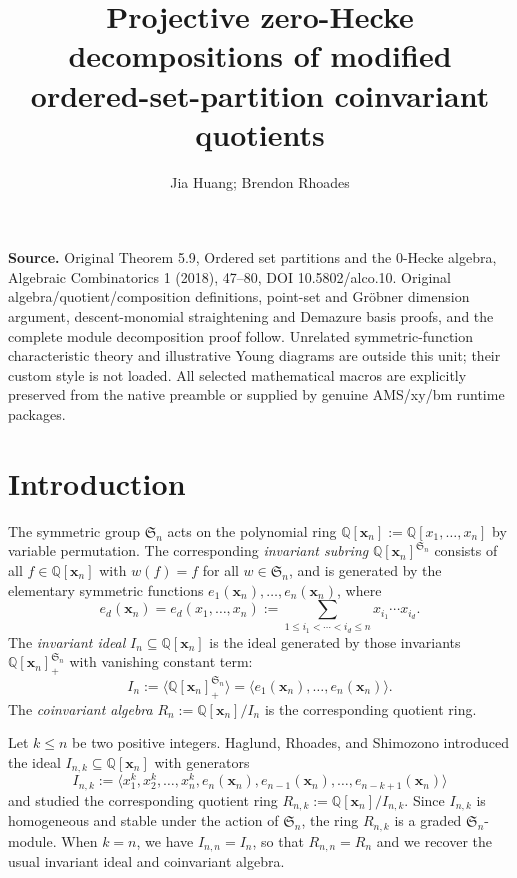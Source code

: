 \documentclass[10pt]{amsart}
\title[Projective zero-Hecke decompositions]{Projective zero-Hecke decompositions of modified ordered-set-partition coinvariant quotients}
\author{Jia Huang; Brendon Rhoades}
\date{}
\theoremstyle{definition}
\newcommand{\symm}{{\mathfrak{S}}}
\newcommand{\QQ}{{\mathbb {Q}}}
\newcommand{\xx}{{\mathbf {x}}}
\begin{document}
\maketitle
\noindent\textbf{Source.} Original Theorem 5.9, Ordered set partitions and the 0-Hecke algebra, Algebraic Combinatorics 1 (2018), 47--80, DOI 10.5802/alco.10. Original algebra/quotient/composition definitions, point-set and Gr\"obner dimension argument, descent-monomial straightening and Demazure basis proofs, and the complete module decomposition proof follow. Unrelated symmetric-function characteristic theory and illustrative Young diagrams are outside this unit; their custom style is not loaded. All selected mathematical macros are explicitly preserved from the native preamble or supplied by genuine AMS/xy/bm runtime packages.
\section{Introduction}
\label{Introduction}
The symmetric group $\symm_n$ acts on the polynomial ring
$\QQ[\xx_n] := \QQ[x_1, \dots, x_n]$ by variable permutation.
The corresponding \emph{invariant subring} $\QQ[\xx_n]^{\symm_n}$ consists of all $f \in \QQ[\xx_n]$ with $w(f) = f$  
for all $w \in \symm_n$, 
and is generated 
by the elementary symmetric functions $e_1(\xx_n), \dots, e_n(\xx_n)$, where
\begin{equation}
e_d(\xx_n) = e_d(x_1, \dots, x_n) := \sum_{1 \leq i_1 < \cdots < i_d \leq n} x_{i_1} \cdots x_{i_d}.
\end{equation}
The \emph{invariant ideal} $I_n \subseteq \QQ[\xx_n]$ is the ideal generated by those invariants
$\QQ[\xx_n]^{\symm_n}_+$ with
vanishing constant term:
\begin{equation}
I_n := \langle \QQ[\xx_n]^{\symm_n}_+ \rangle = \langle e_1(\xx_n), \dots, e_n(\xx_n) \rangle.
\end{equation}
The \emph{coinvariant algebra} $R_n := {\QQ[\xx_n]} / {I_n}$ is the corresponding quotient ring. 

Let $k \leq n$ be two positive integers.  Haglund, Rhoades, and Shimozono \cite[Defn. 1.1]{HRS} introduced
the ideal $I_{n,k} \subseteq \QQ[\xx_n]$ with generators 
\begin{equation}
I_{n,k} := \langle x_1^k, x_2^k, \dots, x_n^k, e_n(\xx_n), e_{n-1}(\xx_n), \dots, e_{n-k+1}(\xx_n) \rangle
\end{equation}
and studied the corresponding quotient ring $R_{n,k} := {\QQ[\xx_n]} / {I_{n,k}}$.  Since $I_{n,k}$ is homogeneous
and
stable 
under the action of $\symm_n$, the ring $R_{n,k}$ is a graded $\symm_n$-module.
When $k = n$, we have $I_{n,n} = I_n$, so that   $R_{n,n} = R_n$ and we recover the usual 
invariant ideal and coinvariant algebra.
\end{document}
